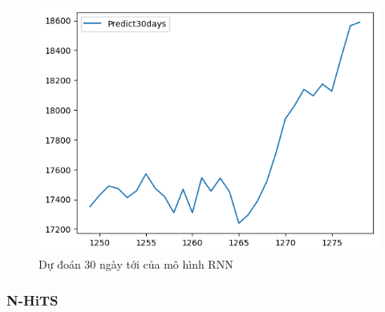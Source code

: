 \begin{figure}[H]
\begin{minipage}{0.15\textwidth}
    \includegraphics[width=1\textwidth]{resources/chapter-5/predicted/EIB_NBeats_9-1_30days.png}
    \end{minipage}
    \hfill
    
    \caption{Dự đoán 30 ngày tới của mô hình RNN}
    \label{fig:NBeats_predicted}
\end{figure}

\subsubsection{N-HiTS}
